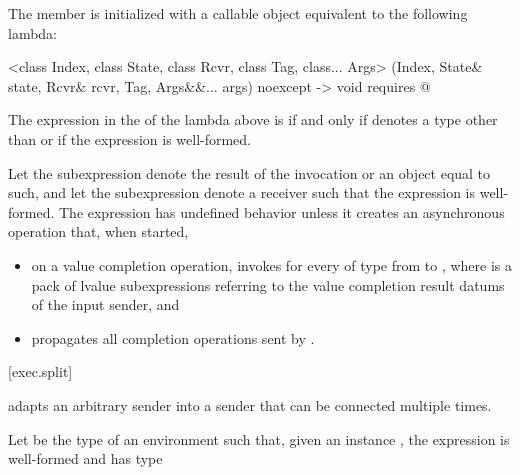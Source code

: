 \pnum
The member 
is initialized with a callable object equivalent to the following lambda:
\begin{codeblock}
[]<class Index, class State, class Rcvr, class Tag, class... Args>
  (Index, State& state, Rcvr& rcvr, Tag, Args&&... args) noexcept -> void requires @
\end{codeblock}

\pnum
The expression in the  of the lambda above
is  if and only
if  denotes a type other than  or
if the expression  is well-formed.

\pnum
Let the subexpression  denote
the result of the invocation  or
an object equal to such, and
let the subexpression  denote a receiver
such that the expression  is well-formed.
The expression  has undefined behavior
unless it creates an asynchronous operation that,
when started,
\begin{itemize}
\item
on a value completion operation,
invokes 
for every  of type  from  to ,
where  is a pack of lvalue subexpressions
referring to the value completion result datums of the input sender, and
\item
propagates all completion operations sent by .
\end{itemize}

[exec.split]{}

\pnum
{} adapts an arbitrary sender
into a sender that can be connected multiple times.

\pnum
Let  be the type of an environment
such that, given an instance ,
the expression  is well-formed and
has type 

